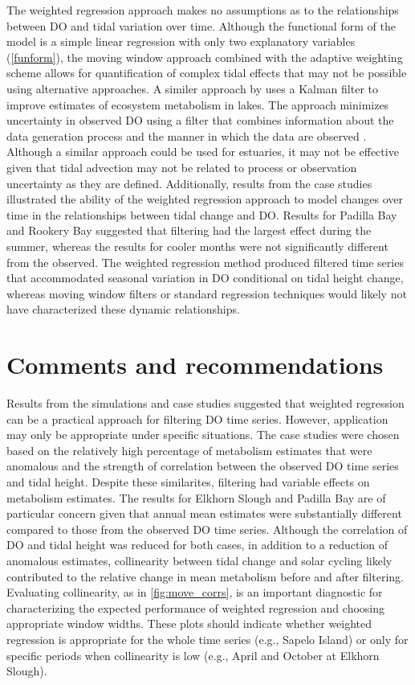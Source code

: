 \documentclass[letterpaper,12pt,oneside]{article}\usepackage[]{graphicx}\usepackage[]{color}
\begin{document}
The weighted regression approach makes no assumptions as to the relationships between \ac{DO} and tidal variation over time.  Although the functional form of the model is a simple linear regression with only two explanatory variables (\cref{funform}), the moving window approach combined with the adaptive weighting scheme allows for quantification of complex tidal effects that may not be possible using alternative approaches.  A similer approach by \citet{Batt12} uses a Kalman filter to improve estimates of ecosystem metabolism in lakes.  The approach minimizes uncertainty in observed \ac{DO} using a filter that combines information about the data generation process and the manner in which the data are observed \citep{Harvey89}.  Although a similar approach could be used for estuaries, it may not be effective given that tidal advection may not be related to process or observation uncertainty as they are defined.  Additionally, results from the case studies illustrated the ability of the weighted regression approach to model changes over time in the relationships between tidal change and \ac{DO}.  Results for Padilla Bay and Rookery Bay suggested that filtering had the largest effect during the summer, whereas the results for cooler months were not significantly different from the observed.  The weighted regression method produced filtered time series that accommodated seasonal variation in \ac{DO} conditional on tidal height change, whereas moving window filters or standard regression techniques would likely not have characterized these dynamic relationships.

\section{Comments and recommendations}

Results from the simulations and case studies suggested that weighted regression can be a practical approach for filtering \ac{DO} time series.  However, application may only be appropriate under specific situations.  The case studies were chosen based on the relatively high percentage of metabolism estimates that were anomalous and the strength of correlation between the observed \ac{DO} time series and tidal height.  Despite these similarites, filtering had variable effects on metabolism estimates.  The results for Elkhorn Slough and Padilla Bay are of particular concern given that annual mean estimates were substantially different compared to those from the observed \ac{DO} time series.  Although the correlation of \ac{DO} and tidal height was reduced for both cases, in addition to a reduction of anomalous estimates, collinearity between tidal change and solar cycling likely contributed to the relative change in mean metabolism before and after filtering.  Evaluating collinearity, as in \cref{fig:move_corrs}, is an important diagnostic for characterizing the expected performance of weighted regression and choosing appropriate window widths.  These plots should indicate whether weighted regression is appropriate for the whole time series (e.g., Sapelo Island) or only for specific periods when collinearity is low (e.g., April and October at Elkhorn Slough). 
\end{document}
